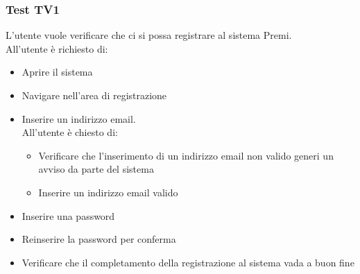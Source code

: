 \subsubsection {Test TV1} %
L'utente vuole verificare che ci si possa registrare al sistema Premi.\\
All'utente è richiesto di:
\begin{itemize}
	\item Aprire il sistema
	\item Navigare nell'area di registrazione
	\item Inserire un indirizzo email. \\
	         All'utente è chiesto di: 
	         \begin{itemize}
	         	\item Verificare che l'inserimento di un indirizzo email non valido generi un avviso da parte del sistema
	         	\item Inserire un indirizzo email valido
	         \end{itemize}
	\item Inserire una password
	\item Reinserire la password per conferma
	\item Verificare che il completamento della registrazione al sistema vada a buon fine
\end{itemize}

